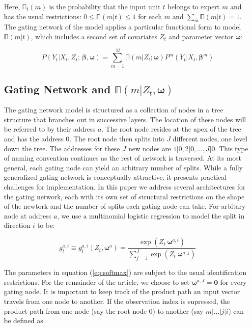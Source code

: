 \documentclass[12pt]{article}
\newcommand{\expmixwt}[0]{\mathbb{\Pi}}
\begin{document}
Here, $\expmixwt_{t}(m)$ is the probability that the input unit $t$ belongs
to expert $m$ and has the usual restrictions: $0 \leq \expmixwt(m|t) \leq 1$
for each $m$ and $\sum_{m} \expmixwt(m|t) = 1$. The gating network of the model
applies a particular functional form to model $\expmixwt(m|t)$, which includes a
second set of covariates $Z_{t}$ and parameter vector $\boldsymbol{\omega}$:

\begin{equation} \label{eq:mixture}
  P(Y_{t} | X_{t}, Z_{t}; \, \boldsymbol{\beta}, \boldsymbol{\omega}) = \sum_{m=1}^{M} \expmixwt(m | Z_{t}; \boldsymbol{\omega}) P^{m}(Y_{t} | X_{t}, \boldsymbol{\beta}^{m})
\end{equation}


\subsection{Gating Network and $\expmixwt(m | Z_{t}, \boldsymbol{\omega})$}

The gating network model is structured as a collection of nodes in a tree
structure that branches out in successive layers. The location of these nodes will
be referred to by their address $a$. The root node resides at the apex of the tree
and has the address $0$. The root node then splits into $J$ different nodes,
one level down the tree. The addresses for these $J$ new nodes are 
$1|0, 2|0, ..., J|0$. This type of naming convention continues as the
rest of network is traversed. At its most general, each gating node can yield an
arbitrary number of splits. While a fully generalized gating network is
conceptually attractive, it presents practical challenges for implementation.
In this paper we address several architectures for the gating network, each
with its own set of structural restrictions on the shape of the newtork and
the number of splits each gating node can take. For arbitary node at address $a$,
we use a multinomial logistic regression to model the split in direction $i$ to be:

\begin{equation} \label{eq:softmax}
  g^{a,i}_{t} \equiv g^{a,i}_{t}(Z_{t}, \boldsymbol{\omega}^{a}) = \frac{\exp(Z_{t} \ \boldsymbol{\omega}^{a,i})}{\sum^{J}_{j=1} {\exp(Z_{t} \ \boldsymbol{\omega}^{a,j})}}
\end{equation}

The parameters in equation (\ref{eq:softmax}) are subject to the usual
identification restrictions. For the remainder of the article, we choose
to set $\boldsymbol{\omega}^{a,J} = \boldsymbol{0}$ for every gating node.
It is important to keep track of the product path an input vector travels from
one node to another. If the observation index is supressed, the product path
from one node (say the root node $0$) to another (say $m|\ldots|j|i$)
can be defined as
\end{document}
